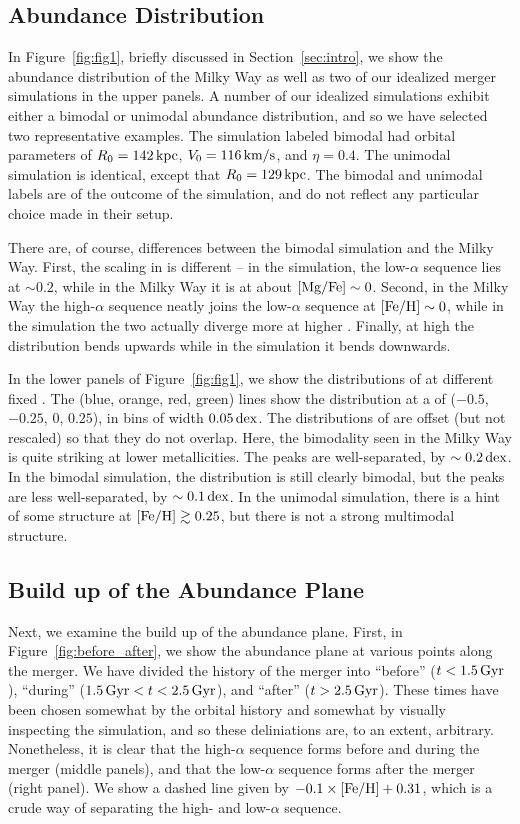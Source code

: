 \subsection{Abundance Distribution}\label{ssec:abundplane}
In Figure~\ref{fig:fig1}, briefly discussed in Section~\ref{sec:intro}, we show the abundance distribution of the Milky Way as well as two of our idealized merger simulations in the upper panels. A number of our idealized simulations exhibit either a bimodal or unimodal abundance distribution, and so we have selected two representative examples. The simulation labeled bimodal had orbital parameters of $R_0=142\,\textrm{kpc}$, $V_0=116\,\textrm{km}/\textrm{s}$, and $\eta=0.4$. The unimodal simulation is identical, except that $R_0=129\,\textrm{kpc}$. The bimodal and unimodal labels are of the outcome of the simulation, and do not reflect any particular choice made in their setup.

There are, of course, differences between the bimodal simulation and the Milky Way. First, the scaling in \MgFe{} is different -- in the simulation, the low-$\alpha$ sequence lies at $\sim0.2$, while in the Milky Way it is at about $[\textrm{Mg}/\textrm{Fe}]\sim0$. Second, in the Milky Way the high-$\alpha$ sequence neatly joins the low-$\alpha$ sequence at $[\textrm{Fe}/\textrm{H}]\sim0$, while in the simulation the two actually diverge more at higher \FeH{}. Finally, at high \FeH{} the distribution bends upwards while in the simulation it bends downwards.

In the lower panels of Figure~\ref{fig:fig1}, we show the distributions of \MgFe{} at different fixed \FeH{}. The (blue, orange, red, green) lines show the \MgFe{} distribution at a \FeH{} of ($-0.5$, $-0.25$, $0$, $0.25$), in bins of width $0.05\,\textrm{dex}$. The distributions of \MgFe{} are offset (but not rescaled) so that they do not overlap. Here, the bimodality seen in the Milky Way is quite striking at lower metallicities. The peaks are well-separated, by $\sim0.2\,\textrm{dex}$. In the bimodal simulation, the distribution is still clearly bimodal, but the peaks are less well-separated, by $\sim0.1\,\textrm{dex}$. In the unimodal simulation, there is a hint of some structure at $[\textrm{Fe}/\textrm{H}] \gtrsim 0.25$, but there is not a strong multimodal structure.

\subsection{Build up of the Abundance Plane}\label{ssec:abundplane_build}
Next, we examine the build up of the abundance plane. First, in Figure~\ref{fig:before_after}, we show the abundance plane at various points along the merger. We have divided the history of the merger into ``before'' ($t < 1.5\,\textrm{Gyr}$), ``during'' ($1.5\,\textrm{Gyr} < t < 2.5\,\textrm{Gyr}$), and ``after'' ($t > 2.5\,\textrm{Gyr}$). These times have been chosen somewhat by the orbital history and somewhat by visually inspecting the simulation, and so these deliniations are, to an extent, arbitrary. Nonetheless, it is clear that the high-$\alpha$ sequence forms before and during the merger (middle panels), and that the low-$\alpha$ sequence forms after the merger (right panel). We show a dashed line given by $-0.1\times[\textrm{Fe}/\textrm{H}] + 0.31$, which is a crude way of separating the high- and low-$\alpha$ sequence.

